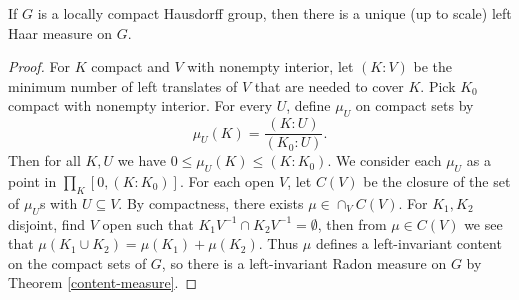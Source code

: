 \documentclass[letterpaper,11pt]{report}
\begin{document}
\begin{thm} If $G$ is a locally compact Hausdorff group, then there is a unique (up to scale) left Haar measure on $G$.
\end{thm}
\begin{proof} For $K$ compact and $V$ with nonempty interior, let $(K:V)$ be the minimum number of left translates of $V$ that are needed to cover $K$. Pick $K_0$ compact with nonempty interior. For every $U$, define $\mu_U$ on compact sets by
\[
\mu_U(K) = \frac{(K:U)}{(K_0:U)}.
\]
Then for all $K,U$ we have $0 \le \mu_U(K) \le (K:K_0)$. We consider each $\mu_U$ as a point in $\prod_K [0,(K:K_0)]$. For each open $V$, let $C(V)$ be the closure of the set of $\mu_U$s with $U \subseteq V$. By compactness, there exists $\mu \in \cap_V C(V)$. For $K_1, K_2$ disjoint, find $V$ open such that $K_1V^{-1} \cap K_2V^{-1} = \emptyset$, then from $\mu \in C(V)$ we see that $\mu(K_1 \cup K_2) = \mu(K_1) + \mu(K_2)$. Thus $\mu$ defines a left-invariant content on the compact sets of $G$, so there is a left-invariant Radon measure on $G$ by Theorem \ref{content-measure}.




\end{proof}
\end{document}
